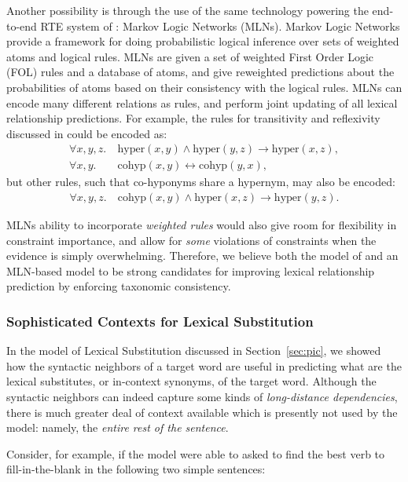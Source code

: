 \documentclass[letterpaper]{article}
\begin{document}
Another possibility is through the use of the same technology powering the
end-to-end RTE system of : Markov Logic Networks
(MLNs).  Markov Logic Networks provide a framework for doing probabilistic
logical inference over sets of weighted atoms and logical rules. MLNs are given
a set of weighted First Order Logic (FOL) rules and a database of atoms, and
give reweighted predictions about the probabilities of atoms based on their
consistency with the logical rules. MLNs can encode many
different relations as rules, and perform joint updating of all lexical
relationship predictions.  For example, the rules for transitivity and reflexivity
discussed in  could be encoded as:
\begin{align*}
  \forall x,y,z. &~\text{hyper}(x,y) \wedge \text{hyper}(y, z) \rightarrow \text{hyper}(x, z),\\
  \forall x,y. &~\text{cohyp}(x,y) \leftrightarrow \text{cohyp}(y,x),
\end{align*}
but other rules, such that co-hyponyms share a hypernym, may also be encoded:
\begin{align*}
  \forall x,y,z. &~\text{cohyp}(x,y) \wedge \text{hyper}(x,z) \rightarrow \text{hyper}(y,z).
\end{align*}

MLNs ability to incorporate {\em weighted rules} would also give room for
flexibility in constraint importance, and allow for {\em some} violations of
constraints when the evidence is simply overwhelming. Therefore, we believe
both the model of  and an MLN-based model to be strong
candidates for improving lexical relationship prediction by enforcing taxonomic
consistency.

\subsubsection{Sophisticated Contexts for Lexical Substitution}

In the model of Lexical Substitution discussed in Section~\ref{sec:pic}, we
showed how the syntactic neighbors of a target word are useful in predicting
what are the lexical substitutes, or in-context synonyms, of the target word.
Although the syntactic neighbors can indeed capture some kinds of {\em long-distance
dependencies}, there is much greater deal of context available which is
presently not used by the model: namely, the {\em entire rest of the sentence}.

Consider, for example, if the model were able to asked to find the best verb
to fill-in-the-blank in the following two simple sentences:
\end{document}
